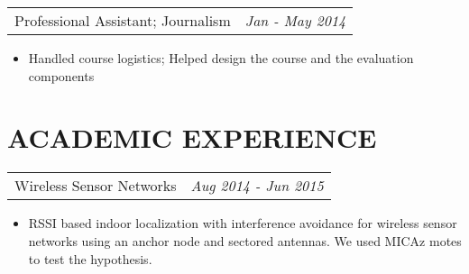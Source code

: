 \documentclass[margin]{res}
\begin{document}
\begin{resume}
                  \begin{tabular}{p{4.2in} r}
                  Professional Assistant; Journalism &  \textit{Jan - May 2014 }
                 \end{tabular}	
		  \begin{itemize} 
                   \item[]  Handled course logistics; Helped design the course and the evaluation components
                  \end{itemize}
                   
\section{ACADEMIC EXPERIENCE}      
                  \begin{tabular}{p{4.2in} r}  %
                  Wireless Sensor Networks &  \textit{Aug 2014 - Jun 2015 }
                  \end{tabular}	
                   \begin{itemize} %
                    \item[] RSSI based indoor localization with interference avoidance for wireless sensor networks using an anchor node and sectored antennas. We used MICAz motes to test the hypothesis. 
		   \end{itemize} 
		   

\end{resume}
\end{document}
